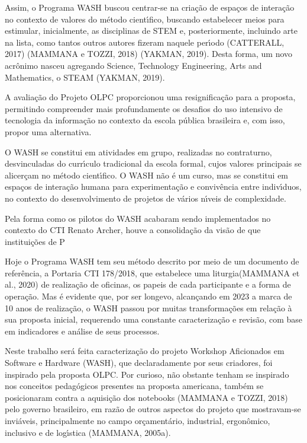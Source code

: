 \documentclass[
12pt,		%
openright,	%
twoside,  %
a4paper,			%
chapter=TITLE,		%
english,			%
french,				%
spanish,			%
brazil				%
]{USPSC-classe/USPSC}
\begin{document}
Assim, o Programa WASH buscou centrar-se na cria\c{c}\~ao de espa\c{c}os de intera\c{c}\~ao no contexto de valores do m\'etodo cient\'{\i}fico, buscando estabelecer meios para estimular, inicialmente, as disciplinas de STEM e, posteriormente, incluindo arte na lista, como tantos outros autores fizeram naquele per\'{\i}odo  (CATTERALL, 2017) (MAMMANA e TOZZI, 2018)  (YAKMAN, 2019). Desta forma, um novo acr\^onimo nasceu agregando Science, Technology Engineering, Arts and Mathematics, o STEAM  (YAKMAN, 2019).




A avalia\c{c}\~ao do Projeto OLPC proporcionou uma resignifica\c{c}\~ao para a proposta, permitindo compreender mais profundamente os desafios do uso intensivo de tecnologia da informa\c{c}\~ao no contexto da escola p\'ublica brasileira e, com isso, propor uma alternativa.




O WASH se constitui em atividades em grupo, realizadas no contraturno, desvinculadas do curr\'{\i}culo tradicional da escola formal, cujos valores principais se alicer\c{c}am no m\'etodo cient\'{\i}fico. O WASH n\~ao \'e um curso, mas se constitui em espa\c{c}os de intera\c{c}\~ao humana para experimenta\c{c}\~ao e conviv\^encia entre indiv\'{\i}duos, no contexto do desenvolvimento de projetos de v\'arios n\'{\i}veis de complexidade.




Pela forma como os pilotos do WASH acabaram sendo implementados no contexto do CTI Renato Archer, houve a consolida\c{c}\~ao da vis\~ao de que institui\c{c}\~oes de P




Hoje o Programa WASH tem seu m\'etodo descrito por meio de um documento de refer\^encia, a Portaria CTI 178/2018, que estabelece uma \textquotedbl liturgia\textquotedbl   (MAMMANA et al., 2020) de realiza\c{c}\~ao de oficinas, os papeis de cada participante e a forma de opera\c{c}\~ao. Mas \'e evidente que, por ser longevo, alcan\c{c}ando em 2023 a marca de 10 anos de realiza\c{c}\~ao, o WASH passou por muitas transforma\c{c}\~oes em rela\c{c}\~ao \`a sua proposta inicial, requerendo uma constante caracteriza\c{c}\~ao e revis\~ao, com base em indicadores e an\'alise de seus processos.




Neste trabalho ser\'a feita caracteriza\c{c}\~ao do projeto Workshop Aficionados em Software e Hardware (WASH), que declaradamente por seus criadores, foi inspirado pela proposta OLPC. Por curioso, n\~ao obstante tenham se inspirado nos conceitos pedag\'ogicos presentes na proposta americana, tamb\'em se posicionaram contra a aquisi\c{c}\~ao dos notebooks  (MAMMANA e TOZZI, 2018) pelo governo brasileiro, em raz\~ao de outros aspectos do projeto que mostravam-se invi\'aveis, principalmente no campo or\c{c}ament\'ario, industrial, ergon\^omico, inclusivo e de log\'{\i}stica  (MAMMANA, 2005a).
\end{document}
